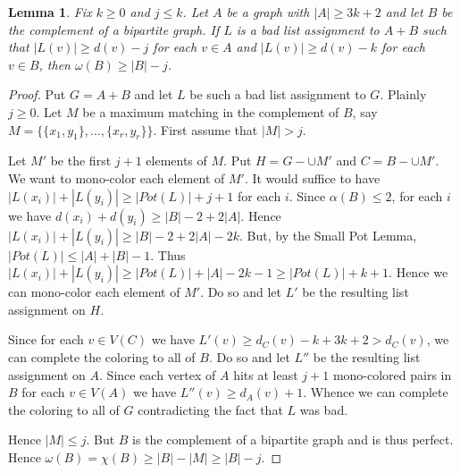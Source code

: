 \documentclass[12pt]{article}
\theoremstyle{plain}
\newtheorem{lem}[thm]{Lemma}
\theoremstyle{definition}
\theoremstyle{remark}
\begin{document}
\begin{lem}\label{ArbitraryBipartiteComplementJoin}
Fix $k \geq 0$ and $j \leq k$. Let $A$ be a graph with $|A| \geq 3k+2$ and let $B$ be the complement of a bipartite graph.  If $L$ is a bad list assignment to $A+B$ such that $|L(v)| \geq d(v) - j$ for each $v \in A$ and $|L(v)| \geq d(v) - k$ for each $v \in B$, then $\omega(B) \geq |B| - j$.
\end{lem}
\begin{proof}
Put $G = A + B$ and let $L$ be such a bad list assignment to $G$. Plainly $j \geq 0$. Let $M$ be a maximum matching in the complement of $B$, say $M = \{\{x_1, y_1\}, \ldots, \{x_r, y_r\}\}$.  First assume that $|M| > j$.\newline

Let $M'$ be the first $j + 1$ elements of $M$. Put $H = G - \cup M'$ and $C = B - \cup M'$.  We want to mono-color each element of $M'$.  It would suffice to have $|L(x_i)| + |L(y_i)| \geq |Pot(L)| + j + 1$ for each $i$.  Since $\alpha(B) \leq 2$, for each $i$ we have $d(x_i) + d(y_i) \geq |B| - 2 + 2|A|$.  Hence $|L(x_i)| + |L(y_i)| \geq |B| - 2 + 2|A| - 2k$.  But, by the Small Pot Lemma, $|Pot(L)| \leq |A| + |B| - 1$.  Thus $|L(x_i)| + |L(y_i)| \geq |Pot(L)| + |A| - 2k - 1 \geq |Pot(L)| + k + 1$.  Hence we can mono-color each element of $M'$.  Do so and let $L'$ be the resulting list assignment on $H$.\newline

Since for each $v \in V(C)$ we have $L'(v) \geq d_C(v) - k + 3k + 2 > d_C(v)$, we can complete the coloring to all of $B$.  Do so and let $L''$ be the resulting list assignment on $A$. Since each vertex of $A$ hits at least $j + 1$ mono-colored pairs in $B$ for each $v \in V(A)$ we have $L''(v) \geq d_A(v) + 1$.  Whence we can complete the coloring to all of $G$ contradicting the fact that $L$ was bad.\newline

Hence $|M| \leq j$.  But $B$ is the complement of a bipartite graph and is thus perfect. Hence $\omega(B) = \chi(B) \geq |B| - |M| \geq |B| - j$.
\end{proof}
\end{document}
